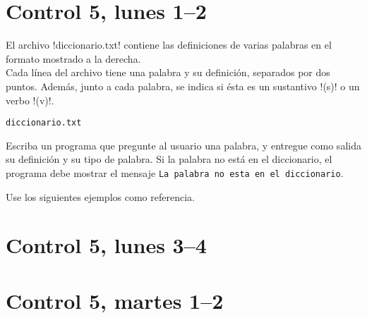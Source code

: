\documentclass[12pt,spanish,a5paper,landscape]{article}
\begin{document}
  \pagestyle{empty}
  \thispagestyle{empty}

  \part*{Control 5, lunes 1--2}
  \newpage

  \begin{minipage}[t]{0.45\textwidth}
    El archivo \li!diccionario.txt!
    contiene las definiciones de varias palabras
    en el formato mostrado a la derecha.
    \\[2ex]
    Cada línea del archivo tiene una palabra y su definición,
    separados por dos puntos.
    Además, junto a cada palabra,
    se indica si ésta es un sustantivo \li!(s)!
    o un verbo \li!(v)!.
  \end{minipage}
  \hfill
  \begin{minipage}[t]{0.45\textwidth}
    \hfil\verb!diccionario.txt!\hfil
    \small
    
  \end{minipage}

  Escriba un programa que pregunte al usuario una palabra,
  y entregue como salida su definición y su tipo de palabra.
  Si la palabra no está en el diccionario,
  el programa debe mostrar el mensaje
  \texttt{La palabra no esta en el diccionario}.

  Use los siguientes ejemplos como referencia.

  \begin{minipage}[t]{0.6\textwidth}
    
  \end{minipage}

  \begin{minipage}[t]{0.6\textwidth}
    
  \end{minipage}

  \newpage

  \part*{Control 5, lunes 3--4}
  \newpage

  \newpage

  \part*{Control 5, martes 1--2}
  \newpage

  \newpage
\end{document}

